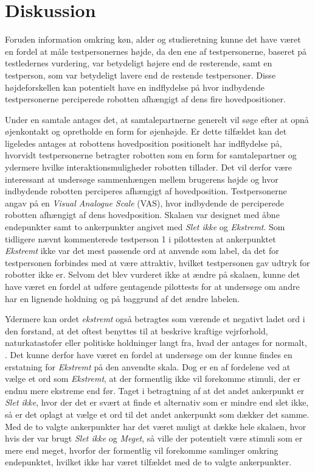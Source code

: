 \section*{Diskussion}
\label{Diskussion}
%
Foruden information omkring køn, alder og studieretning kunne det have været en fordel at måle testpersonernes højde, da den ene af testpersonerne, baseret på testledernes vurdering, var betydeligt højere end de resterende, samt en testperson, som var betydeligt lavere end de restende testpersoner. Disse højdeforskellen kan potentielt have en indflydelse på hvor indbydende testpersonerne perciperede robotten afhængigt af dens fire hovedpositioner. 

Under en samtale antages det, at samtalepartnerne generelt vil søge efter at opnå øjenkontakt og opretholde en form for øjenhøjde. Er dette tilfældet kan det ligeledes antages at robottens hovedposition positionelt har indflydelse på, hvorvidt testpersonerne betragter robotten som en form for samtalepartner og ydermere hvilke interaktionsmuligheder robotten tillader. Det vil derfor være interessant at undersøge sammenhængen mellem brugerens højde og hvor indbydende robotten perciperes afhængigt af hovedposition.\blankline  
%
Testpersonerne angav på en \textit{Visual Analogue Scale} (VAS), hvor indbydende de perciperede robotten afhængigt af dens hovedposition. Skalaen var designet med åbne endepunkter samt to ankerpunkter angivet med \textit{Slet ikke} og \textit{Ekstremt}. Som tidligere nævnt kommenterede testperson 1 i pilottesten at ankerpunktet \textit{Ekstremt} ikke var det mest passende ord at anvende som label, da det for testpersonen forbindes med at være attraktiv, hvilket testpersonen gav udtryk for robotter ikke er. Selvom det blev vurderet ikke at ændre på skalaen, kunne det have været en fordel at udføre gentagende pilottests for at undersøge om andre har en lignende holdning og på baggrund af det ændre labelen.    

Ydermere kan ordet \textit{ekstremt} også betragtes som værende et negativt ladet ord i den forstand, at det oftest benyttes til at beskrive kraftige vejrforhold, naturkatastofer eller politiske holdninger langt fra, hvad der antages for normalt, \parencite{Oxford2017}. Det kunne derfor have været en fordel at undersøge om der kunne findes en erstatning for \textit{Ekstremt} på den anvendte skala. Dog er en af fordelene ved at vælge et ord som \textit{Ekstremt}, at der formentlig ikke vil forekomme stimuli, der er endnu mere ekstreme end før. Taget i betragtning af at det andet ankerpunkt er \textit{Slet ikke}, hvor der det er svært at finde et alternativ som er mindre end slet ikke, så er det oplagt at vælge et ord til det andet ankerpunkt som dækker det samme. Med de to valgte ankerpunkter har det været muligt at dække hele skalaen, hvor hvis der var brugt \textit{Slet ikke} og \textit{Meget}, så ville der potentielt være stimuli som er mere end meget, hvorfor der formentlig vil forekomme samlinger omkring endepunktet, hvilket ikke har været tilfældet med de to valgte ankerpunkter.\blankline
%
 


